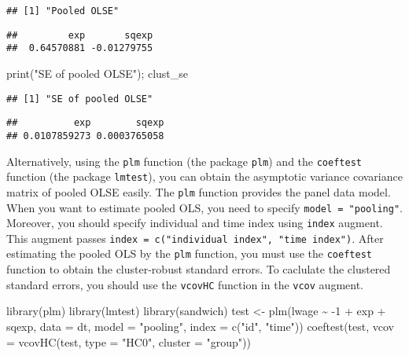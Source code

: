\documentclass[
  12pt,
]{article}
\newenvironment{Shaded}{\begin{snugshade}}{\end{snugshade}}
\newcommand{\AttributeTok}[1]{\textcolor[rgb]{0.77,0.63,0.00}{#1}}
\newcommand{\DecValTok}[1]{\textcolor[rgb]{0.00,0.00,0.81}{#1}}
\newcommand{\FunctionTok}[1]{\textcolor[rgb]{0.00,0.00,0.00}{#1}}
\newcommand{\NormalTok}[1]{#1}
\newcommand{\OtherTok}[1]{\textcolor[rgb]{0.56,0.35,0.01}{#1}}
\newcommand{\SpecialCharTok}[1]{\textcolor[rgb]{0.00,0.00,0.00}{#1}}
\newcommand{\StringTok}[1]{\textcolor[rgb]{0.31,0.60,0.02}{#1}}
\begin{document}
\begin{verbatim}
## [1] "Pooled OLSE"
\end{verbatim}

\begin{verbatim}
##         exp       sqexp 
##  0.64570881 -0.01279755
\end{verbatim}

\begin{Shaded}
\begin{Highlighting}[]
\FunctionTok{print}\NormalTok{(}\StringTok{"SE of pooled OLSE"}\NormalTok{); clust\_se}
\end{Highlighting}
\end{Shaded}

\begin{verbatim}
## [1] "SE of pooled OLSE"
\end{verbatim}

\begin{verbatim}
##          exp        sqexp 
## 0.0107859273 0.0003765058
\end{verbatim}

Alternatively, using the \texttt{plm} function (the package
\texttt{plm}) and the \texttt{coeftest} function (the package
\texttt{lmtest}), you can obtain the asymptotic variance covariance
matrix of pooled OLSE easily. The \texttt{plm} function provides the
panel data model. When you want to estimate pooled OLS, you need to
specify \texttt{model\ =\ "pooling"}. Moreover, you should specify
individual and time index using \texttt{index} augment. This augment
passes \texttt{index\ =\ c("individual\ index",\ "time\ index")}. After
estimating the pooled OLS by the \texttt{plm} function, you must use the
\texttt{coeftest} function to obtain the cluster-robust standard errors.
To caclulate the clustered standard errors, you should use the
\texttt{vcovHC} function in the \texttt{vcov} augment.

\begin{Shaded}
\begin{Highlighting}[]
\FunctionTok{library}\NormalTok{(plm)}
\FunctionTok{library}\NormalTok{(lmtest)}
\FunctionTok{library}\NormalTok{(sandwich)}
\NormalTok{test }\OtherTok{\textless{}{-}} \FunctionTok{plm}\NormalTok{(lwage }\SpecialCharTok{\textasciitilde{}} \SpecialCharTok{{-}}\DecValTok{1} \SpecialCharTok{+}\NormalTok{ exp }\SpecialCharTok{+}\NormalTok{ sqexp, }\AttributeTok{data =}\NormalTok{ dt, }\AttributeTok{model =} \StringTok{"pooling"}\NormalTok{, }\AttributeTok{index =} \FunctionTok{c}\NormalTok{(}\StringTok{"id"}\NormalTok{, }\StringTok{"time"}\NormalTok{))}
\FunctionTok{coeftest}\NormalTok{(test, }\AttributeTok{vcov =} \FunctionTok{vcovHC}\NormalTok{(test, }\AttributeTok{type =} \StringTok{"HC0"}\NormalTok{, }\AttributeTok{cluster =} \StringTok{"group"}\NormalTok{))}
\end{Highlighting}
\end{Shaded}
\end{document}
